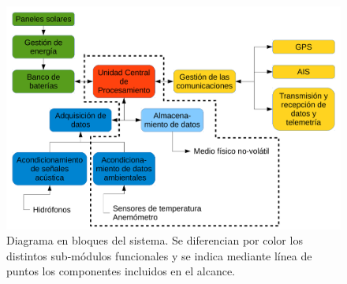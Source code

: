 \begin{figure}[h]
	\includegraphics[width=\textwidth]{./Figures/Diagrama_en_Bloques_reducido.pdf}
	\caption{Diagrama en bloques del sistema. Se diferencian por color los distintos sub-módulos funcionales y se indica mediante línea de puntos los componentes incluidos en el alcance.}
	\label{fig:diagramaBloquesReducido}
\end{figure}





